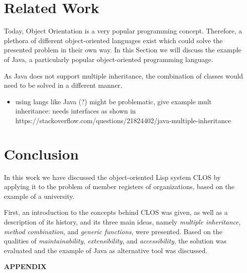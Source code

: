 \documentclass[oribibl]{llncs}
\begin{document}
\section{Related Work}
\label{sec:related}

Today, Object Orientation is a very popular programming concept. Therefore, a plethora of different object-oriented languages exist which could solve the presented problem in their own way. In this Section we will discuss the example of Java, a particularly popular object-oriented programming language.

As Java does not support multiple inheritance, the combination of classes would need to be solved in a different manner.

\begin{itemize}
\item using langs like Java (?) might be problematic, give example mult inheritance: needs interfaces as shown in https://stackoverflow.com/questions/21824402/java-multiple-inheritance
\end{itemize}


\section{Conclusion}
\label{sec:conclusion}

In this work we have discussed the object-oriented Lisp system CLOS by applying it to the problem of member registers of organizations, based on the example of a university. 

First, an introduction to the concepts behind CLOS was given, as well as a description of its history, and its three main ideas, namely \emph{multiple inheritance}, \emph{method combination}, and \emph{generic functions}, were presented. Based on the qualities of \emph{maintainability}, \emph{extensibility}, and \emph{accessibility}, the solution was evaluated and the example of Java as alternative tool was discussed.

\newpage
\nocite{*}



\newpage
    \begin{center}
      {\bf APPENDIX}
    \end{center}
\label{sec:appendix}
\end{document}
